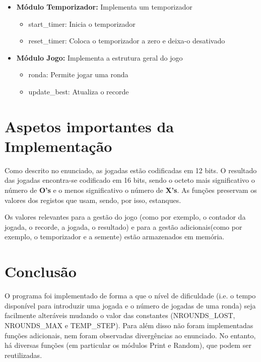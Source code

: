 \documentclass[11pt]{report}
\begin{document}
\begin{itemize}
\item \textbf{Módulo Temporizador:} Implementa um temporizador
  \begin{itemize}
  \item start\_timer: Inicia o temporizador
  \item reset\_timer: Coloca o temporizador a zero e deixa-o desativado
  \end{itemize}
 
\item \textbf{Módulo Jogo:} Implementa a estrutura geral do jogo
  \begin{itemize}
  \item ronda: Permite jogar uma ronda
  \item update\_best: Atualiza o recorde
  \end{itemize}
 


\end{itemize}
\section*{Aspetos importantes da Implementação}
Como descrito no enunciado, as jogadas estão codificadas em 12 bits. O
resultado das jogadas encontra-se codificado em 16 bits, sendo o octeto
mais significativo o número de \textbf{O's} e o menos significativo o
número de \textbf{X's}. As funções preservam os valores dos registos que
usam, sendo, por isso, estanques.

Os valores relevantes para a gestão do jogo (como por exemplo, o
contador da jogada, o recorde, a jogada, o resultado) e para a gestão
adicionais(como por exemplo, o temporizador e a semente) estão
armazenados em memória.

\section*{Conclusão}
O programa foi implementado de forma a que o
nível de dificuldade (i.e. o tempo disponível para introduzir  uma
jogada e o número de jogadas de uma ronda) seja facilmente alteráveis
mudando o valor das constantes (NROUNDS\_LOST, NROUNDS\_MAX e
TEMP\_STEP). Para além disso não foram implementadas funções adicionais,
nem foram observadas divergências ao enunciado.
No entanto, há diversas funções (em particular os módulos Print e Random), que
podem ser reutilizadas.
\end{document}
